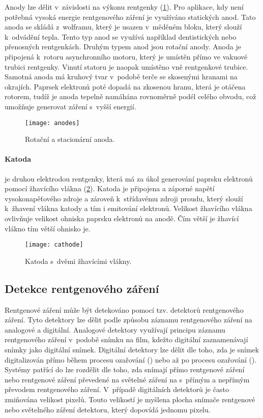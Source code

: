 Anody lze dělit v~závislosti na výkonu rentgenky (\cref{fig:anodes}). Pro aplikace, kdy není potřebná vysoká energie rentgenového záření je využíváno statických anod. Tato anoda se skládá z~wolframu, který je usazen v~měděném bloku, který slouží k~odvádění tepla. Tento typ anod se využívá například dentistických nebo přenosných rentgenkách. Druhým typem anod jsou rotační anody. Anoda je připojená k~rotoru asynchronního motoru, který je umístěn přímo ve vakuové trubici rentgenky. Vinutí statoru je naopak umístěno vně rentgenkové trubice. Samotná anoda má kruhový tvar v~podobě terče se skosenými hranami na okrajích. Paprsek elektronů poté dopadá na zkosenou hranu, která je otáčena rotorem, tudíž je anoda tepelně namáhána rovnoměrně podél celého obvodu, což umožňuje generovat záření s~vyšší energií. \cite[str.~98]{Diagnostic-Radiology-Physics}

\begin{figure}[hb]
\centering
\texttt{[image: anodes]}
\caption{Rotační a stacionární anoda. \cite{the-xray-beam}}
\label{fig:anodes}
\end{figure}


\paragraph{Katoda}
je druhou elektrodou rentgenky, která má za úkol generování paprsku elektronů pomocí žhavícího vlákna (\cref{fig:cathode}). Katoda je připojena a záporné napětí vysokonapěťového zdroje a zároveň k~střídavému zdroji proudu, který slouží k~žhavení vlákna katody a tím i emitování elektronů.\cite[str.~93]{Diagnostic-Radiology-Physics} Velikost žhavícího vlákna ovlivňuje velikost ohniska paprsku elektronů na anodě. Čím větší je žhavící vlákno tím větší ohnisko je.

\begin{figure}[hb]
\centering
\texttt{[image: cathode]}
\caption{Katoda s~dvěmi žhavícími vlákny. \cite{the-xray-beam}}
\label{fig:cathode}
\end{figure}

\subsection{Detekce rentgenového záření}
Rentgenové záření může být detekováno pomocí tzv. detektorů rentgenového záření. Tyto detektory lze dělit podle způsobu záznamu rentgenového záření na analogové a digitální. Analogové detektory využívají principu záznamu rentgenového záření v~podobě snímku na film, kdežto digitální zaznamenávají snímky jako digitální snímek. Digitální detektory lze dělit dle toho, zda je snímek digitalizován přímo během procesu ozařování () nebo až po procesu ozařování (). Systémy patřící do  lze rozdělit dle toho, zda snímají přímo rentgenové záření nebo rentgenové záření převedené na světelné záření na  s~přímým a nepřímým převodem rentgenového záření. V~případě digitálních detektorů je často zmiňována velikost pixelů. Touto velikostí je myšlena plocha snímače rentgenové nebo světelného záření detektoru, který dopovídá jednomu pixelu.

